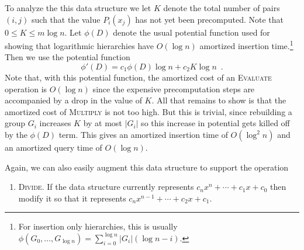 \documentclass[lotsofwhite]{patmorin}
\begin{document}
To analyze the this data structure we let $K$ denote the total number
of pairs $(i,j)$ such that the value $P_i(x_j)$ has not yet been
precomputed.  Note that $0\le K\le m\log n$.   Let $\phi(D)$ denote
the usual potential function used for showing that logarithmic
hierarchies have $O(\log n)$ amortized insertion time.\footnote{For
insertion only hierarchies, this is usually $\phi(G_0,\ldots,G_{\log
n})= \sum_{i=0}^{\log n}
|G_i|(\log n - i)$.} Then we use
the potential function
\[
 \phi'(D) = c_1\phi(D)\log n + c_2K\log n  \enspace .
\]
Note that, with this potential function, the amortized cost of an
\textsc{Evaluate} operation is $O(\log n)$ since the expensive
precomputation steps are accompanied by a drop in the value of $K$. All that remains to show is that the amortized cost of
\textsc{Multiply} is not too high.  But this is trivial, since
rebuilding a group $G_i$ increases $K$ by at most $|G_i|$ so this
increase in potential gets killed off by the $\phi(D)$ term.  This
gives an amortized insertion time of $O(\log^2 n)$ and an amortized
query time of $O(\log n)$.

Again, we can also easily augment this data structure to support the operation
\begin{enumerate}
\item \textsc{Divide}.  If the data structure currently represents
$c_nx^n+\cdots+c_1x + c_0$ then modify it so that it represents
$c_nx^{n-1}+\cdots+c_2x + c_1$.
\end{enumerate}
\end{document}
